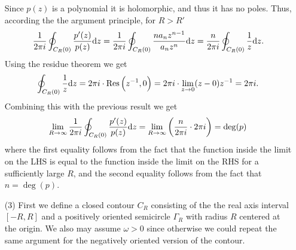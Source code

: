 \documentclass[11pt,a4paper]{article}
\begin{document}
\begin{solution}
\begin{enumerate}
    Since $p(z)$ is a polynomial it is holomorphic, and thus it has no
    poles. Thus, according the the argument principle, for $R > R'$
    \[
        \frac{1}{2 \pi i}
        \oint_{C_R(0)} \frac{p'(z)}{p(z)} \dz =
        \frac{1}{2 \pi i}
        \oint_{C_R(0)} \frac{n a_n z^{n-1}}{a_n z^{n}} \dz =
        \frac{n}{2 \pi i}
        \oint_{C_R(0)} \frac{1}{z} \dz.
    \]
    Using the residue theorem we get
    \[
      \oint_{C_R(0)} \frac{1}{z} \dz =
      2 \pi i \cdot \Res\del{z^{-1}, 0} =
      2 \pi i \cdot \lim_{z \to 0} (z - 0) z^{-1} = 2 \pi i.
    \]
    Combining this with the previous result we get
    \[
        \lim_{R \to \infty}
        \frac{1}{2 \pi i}
        \oint_{C_R(0)} \frac{p'(z)}{p(z)} \dz =
        \lim_{R \to \infty}
        \del{\frac{n}{2 \pi i} \cdot 2 \pi i} = \deg(p)
    \]
    where the first equality follows from the fact that the function inside
    the limit on the LHS is equal to the function inside the limit on the RHS
    for a sufficiently large $R$, and the second equality follows from the
    fact that $n = \deg(p)$.
  \item[(3)] First we define a closed contour $C_R$ consisting of the the real
    axis interval $[-R,R]$ and a positively oriented semicircle $\Gamma_R$
    with radius $R$ centered at the origin.
    We also may assume $\omega > 0$ since otherwise we could repeat the same
    argument for the negatively oriented version of the contour.


\end{enumerate}
\end{solution}
\end{document}
